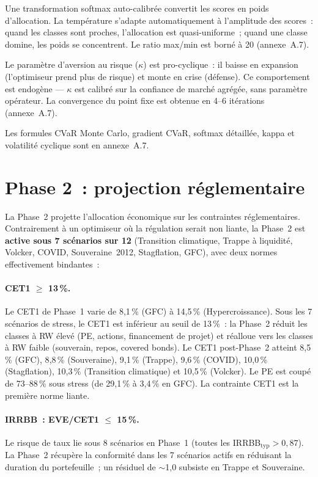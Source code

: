 \documentclass[10pt, a4paper, oneside]{report}
\theoremstyle{definition}
\begin{document}
Une transformation softmax auto-calibrée convertit les scores en poids d'allocation. La température s'adapte automatiquement à l'amplitude des scores~: quand les classes sont proches, l'allocation est quasi-uniforme~; quand une classe domine, les poids se concentrent. Le ratio max/min est borné à 20 (annexe~A.7).

Le paramètre d'aversion au risque ($\kappa$) est pro-cyclique~: il baisse en expansion (l'optimiseur prend plus de risque) et monte en crise (défense). Ce comportement est endogène --- $\kappa$ est calibré sur la confiance de marché agrégée, sans paramètre opérateur. La convergence du point fixe est obtenue en 4--6 itérations (annexe~A.7).

Les formules CVaR Monte Carlo, gradient CVaR, softmax détaillée, kappa et volatilité cyclique sont en annexe~A.7.


\section{Phase 2~: projection réglementaire}
\label{sec:ch4:phase2}

La Phase~2 projette l'allocation économique sur les contraintes réglementaires. Contrairement à un optimiseur où la régulation serait non liante, la Phase~2 est \textbf{active sous 7 scénarios sur 12} (Transition climatique, Trappe à liquidité, Volcker, COVID, Souveraine~2012, Stagflation, GFC), avec deux normes effectivement bindantes~:

\paragraph{CET1 $\geq$ 13\,\%.} Le CET1 de Phase~1 varie de 8{,}1\,\% (GFC) à 14{,}5\,\% (Hypercroissance). Sous les 7 scénarios de stress, le CET1 est inférieur au seuil de 13\,\%~: la Phase~2 réduit les classes à RW élevé (PE, actions, financement de projet) et réalloue vers les classes à RW faible (souverain, repos, covered bonds). Le CET1 post-Phase~2 atteint 8{,}5\,\% (GFC), 8{,}8\,\% (Souveraine), 9{,}1\,\% (Trappe), 9{,}6\,\% (COVID), 10{,}0\,\% (Stagflation), 10{,}3\,\% (Transition climatique) et 10{,}5\,\% (Volcker). Le PE est coupé de 73--88\,\% sous stress (de 29{,}1\,\% à 3{,}4\,\% en GFC). La contrainte CET1 est la première norme liante.

\paragraph{IRRBB~: EVE/CET1 $\leq$ 15\,\%.} Le risque de taux lie sous 8 scénarios en Phase~1 (toutes les IRRBB$_{\text{typ}} > 0{,}87$). La Phase~2 récupère la conformité dans les 7 scénarios actifs en réduisant la duration du portefeuille~; un résiduel de $\sim$1{,}0 subsiste en Trappe et Souveraine.
\end{document}
